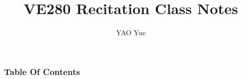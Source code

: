 \documentclass[slidestop,compress,mathserif]{beamer}
\title{VE280 Recitation Class Notes}
\author{YAO Yue}
\institute{VE280 SU17 TA Group}
\begin{document}
	\begin{frame} %
	\titlepage
	\end{frame}
	
	\begin{frame}
		\frametitle{Table Of Contents}
		\tableofcontents
	\end{frame}

	



	
\end{document}
